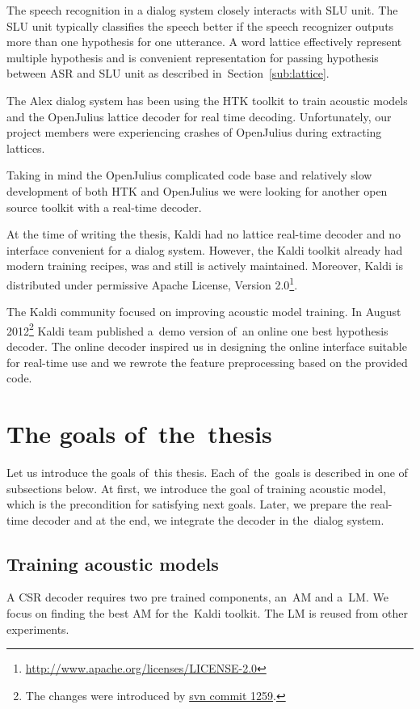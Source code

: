 The speech recognition in a dialog system closely interacts with \acl{SLU} unit.
The \ac{SLU} unit typically classifies the speech better 
if the speech recognizer outputs more than one hypothesis for one utterance. 
A word lattice effectively represent multiple hypothesis and is convenient
representation for passing hypothesis between \ac{ASR} and \ac{SLU} unit 
as described in~Section~\ref{sub:lattice}.

The Alex dialog system has been using the \ac{HTK} toolkit\cite{young94htk} 
to train acoustic models and 
the OpenJulius\cite{lee2009julius} lattice decoder for real time decoding. 
Unfortunately, our project members were experiencing crashes 
of OpenJulius during extracting lattices.

Taking in mind the OpenJulius complicated code base and relatively slow
development of both \ac{HTK} and OpenJulius we were looking 
for another open source toolkit with a real-time decoder.

At the time of writing the thesis, Kaldi had no lattice real-time decoder
and no interface convenient for a dialog system.
However, the Kaldi toolkit already had modern training recipes, 
was and still is actively maintained. Moreover, Kaldi is distributed 
under permissive Apache License, Version 2.0\footnote{\url{http://www.apache.org/licenses/LICENSE-2.0}}.

The Kaldi community focused on improving acoustic model training. 
In August 2012\footnote{The changes were introduced by \href{https://sourceforge.net/p/kaldi/code/1259/}{svn commit 1259}.}
Kaldi team published a~demo version of~an online one best hypothesis decoder.
The online decoder inspired us in designing 
the online interface suitable for real-time use and
we rewrote the feature preprocessing based on the provided code.

\section{The goals of~the~thesis} 
\label{sec:goals}
Let us introduce the goals of~this thesis. Each of~the~goals is described in one of subsections below.
At first, we introduce the goal of training acoustic model, which is the precondition for satisfying next goals.
Later, we prepare the real-time decoder and at the end, we integrate the decoder in the~dialog system. 

\subsection{Training acoustic models} 
\label{sub:training_kaldi_acoustic_models}
A \acl{CSR} decoder requires two pre trained components, an~\acl{AM} and 
a~\acl{LM}. We focus on finding the best \acl{AM} for the~Kaldi toolkit. 
The \acl{LM} is reused from other experiments.

